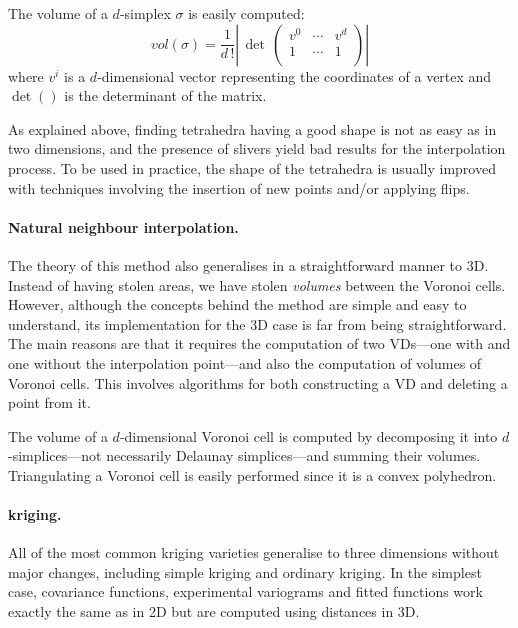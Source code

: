 The volume of a $d$-simplex $\sigma$ is easily computed:
\begin{equation}
vol(\sigma) = \frac{1}{d \, !} \left| \,  
                            \det \, \left( 
                                  \begin{array}{ccc}
                                    v^{0} & \cdots & v^{d} \\
                                    1     & \cdots & 1 \\
                                  \end{array}
                                \right)
                        \right|
\end{equation}  
where $v^{i}$ is a $d$-dimensional vector representing the coordinates of a vertex and $\det()$ is the determinant of the matrix. 

As explained above, finding tetrahedra having a good shape is not as easy as in two dimensions, and the presence of slivers yield bad results for the interpolation process. 
To be used in practice, the shape of the tetrahedra is usually improved with techniques involving the insertion of new points and/or applying flips.


\paragraph{Natural neighbour interpolation.}
The theory of this method also generalises in a straightforward manner to 3D.
Instead of having stolen areas, we have stolen \emph{volumes} between the Voronoi cells.
However, although the concepts behind the method are simple and easy to understand, its implementation for the 3D case is far from being straightforward. 
The main reasons are that it requires the computation of two VDs---one with and one without the interpolation point---and also the computation of volumes of Voronoi cells. 
This involves algorithms for both constructing a VD and deleting a point from it.

The volume of a $d$-dimensional Voronoi cell is computed by decomposing it into $d$-simplices---not necessarily Delaunay simplices---and summing their volumes. 
Triangulating a Voronoi cell is easily performed since it is a convex polyhedron.

\paragraph{kriging.}
All of the most common kriging varieties generalise to three dimensions without major changes, including simple kriging and ordinary kriging.
In the simplest case, covariance functions, experimental variograms and fitted functions work exactly the same as in 2D but are computed using distances in 3D.

